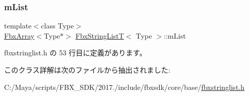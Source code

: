 \subsubsection{\texorpdfstring{m\+List}{mList}}
{\footnotesize\ttfamily template$<$class Type$>$ \\
\hyperlink{class_fbx_array}{Fbx\+Array}$<$Type$\ast$$>$ \hyperlink{class_fbx_string_list_t}{Fbx\+String\+ListT}$<$ Type $>$\+::m\+List\hspace{0.3cm}{\ttfamily [protected]}}



 fbxstringlist.\+h の 53 行目に定義があります。



このクラス詳解は次のファイルから抽出されました\+:\begin{DoxyCompactItemize}
\item 
C\+:/\+Maya/scripts/\+F\+B\+X\+\_\+\+S\+D\+K/2017./include/fbxsdk/core/base/\hyperlink{fbxstringlist_8h}{fbxstringlist.\+h}\end{DoxyCompactItemize}
